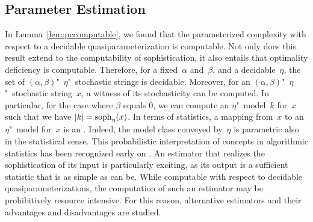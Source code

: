\subsection{Parameter Estimation}
In Lemma~\ref{lem:pccomputable}, we found that the parameterized complexity with respect to a decidable quasiparameterization is computable.
Not only does this result extend to the computability of sophistication, it also entails that optimality deficiency is computable.
Therefore, for a fixed~$\alpha$ and~$\beta$, and a decidable~$\eta$, the set of $(\alpha, \beta)$"~$\eta$"~stochastic strings is decidable.
Moreover, for an $(\alpha, \beta)$"~$\eta$"~stochastic string~$x$, a witness of its stochasticity can be computed.
In particular, for the case where $\beta$ equals $0$, we can compute an $\eta$"~model~$k$ for~$x$ such that we have ${\lvert k\rvert} = \operatorname{soph}_\eta(x)$.
In terms of statistics, a mapping from~$x$ to an $\eta$"~model for~$x$ is an .
Indeed, the model class conveyed by~$\eta$ is parametric also in the statistical sense.
This probabilistic interpretation of concepts in algorithmic statistics has been recognized early on \parencite{rissanen1983universal,vitanyi2000minimum,gacs2001algorithmic}.
An estimator that realizes the sophistication of its input is particularly exciting, as its output is a sufficient statistic that is as simple as can be.
While computable with respect to decidable quasiparameterizations, the computation of such an estimator may be prohibitively resource intensive.
For this reason, alternative estimators and their advantages and disadvantages are studied.

